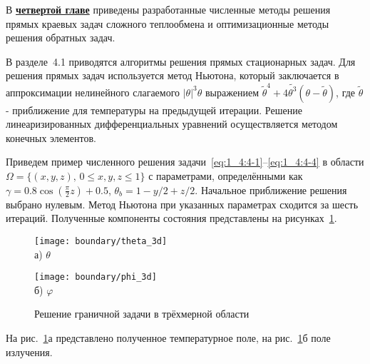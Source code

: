 В \underline{\textbf{четвертой главе}} приведены разработанные численные методы решения
прямых краевых задач сложного теплообмена и оптимизационные методы решения обратных задач.


В разделе~4.1 приводятся алгоритмы решения прямых стационарных задач.
Для решения прямых задач используется метод Ньютона, который заключается в аппроксимации
нелинейного слагаемого $|\theta|^3 \theta$
выражением $\widetilde{\theta}^4+4 \widetilde{\theta^3}(\theta-\widetilde{\theta})$,
где $\widetilde{\theta}$ - приближение для температуры на предыдущей итерации.
Решение линеаризированных дифференциальных уравнений осуществляется методом
конечных элементов.


Приведем пример численного решения задачи~\eqref{eq:1_4:4-1}--\eqref {eq:1_4:4-4}
в области $\Omega=\{(x,y,z),\, 0 \leq x,y,z \leq 1 \}$
с параметрами, определёнными как
$\gamma = 0.8 \cos\left(\frac{\pi}{2} z\right) + 0.5$,
$\theta_b = 1- y / 2 + z /2$.
Начальное приближение решения выбрано нулевым.
Метод Ньютона при указанных параметрах сходится за шесть итераций.
Полученные компоненты состояния представлены на рисунках~\ref{fig:4_1:boundary_3d}.
\begin{figure}[h!t]
    \begin{minipage}[b][][b]{0.49\linewidth}
        \centering
        \texttt{[image: boundary/theta\_3d]} \\ а) $\theta$
    \end{minipage}
    \hfill
    \begin{minipage}[b][][b]{0.49\linewidth}
        \centering
        \texttt{[image: boundary/phi\_3d]} \\ б) $\varphi$
    \end{minipage}
    \caption{Решение граничной задачи в трёхмерной области}
    \label{fig:4_1:boundary_3d}
\end{figure}
На рис.~\ref{fig:4_1:boundary_3d}а представлено полученное температурное поле,
на рис.~\ref{fig:4_1:boundary_3d}б поле излучения.



